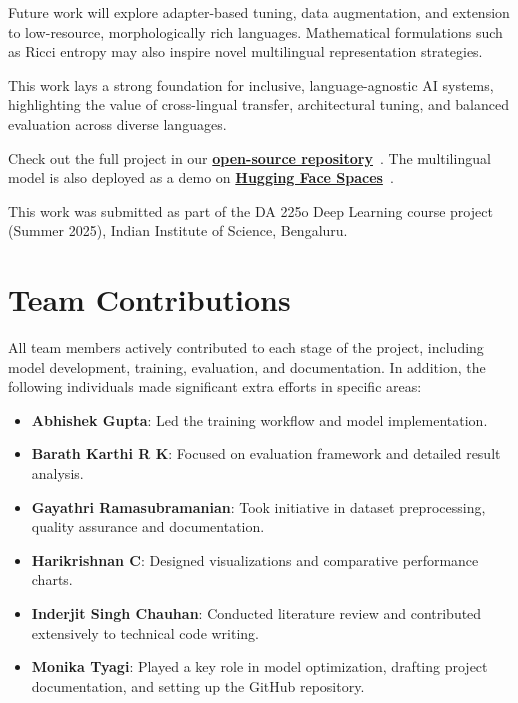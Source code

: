 \documentclass{ecai}
\begin{document}
Future work will explore adapter-based tuning, data augmentation, and extension to low-resource, morphologically rich languages. Mathematical formulations such as Ricci entropy \cite{perelman2002entropy} may also inspire novel multilingual representation strategies.

This work lays a strong foundation for inclusive, language-agnostic AI systems, highlighting the value of cross-lingual transfer, architectural tuning, and balanced evaluation across diverse languages. 

Check out the full project in our \href{https://github.com/monikatyagiisc/deep-data-squad-19}{\textbf{open-source repository}}~\cite{deepdatasquad2025}.  
The multilingual model is also deployed as a demo on \href{https://huggingface.co/spaces/charikri/IntentBert#multilingual-intent-classification}{\textbf{Hugging Face Spaces}}~\cite{intentbert_demo2025}.


\begin{ack}
This work was submitted as part of the DA 225o Deep Learning course project (Summer 2025), Indian Institute of Science, Bengaluru.
\end{ack}




\newpage
\section*{Team Contributions}
All team members actively contributed to each stage of the project, including model development, training, evaluation, and documentation. In addition, the following individuals made significant extra efforts in specific areas:

\begin{itemize}
    \item \textbf{Abhishek Gupta}: Led the training workflow and model implementation.
    \item \textbf{Barath Karthi R K}: Focused on evaluation framework and detailed result analysis.
    \item \textbf{Gayathri Ramasubramanian}: Took initiative in dataset preprocessing, quality assurance and documentation.
    \item \textbf{Harikrishnan C}: Designed visualizations and comparative performance charts.
    \item \textbf{Inderjit Singh Chauhan}: Conducted literature review and contributed extensively to technical code writing.
    \item \textbf{Monika Tyagi}: Played a key role in model optimization, drafting project documentation, and setting up the GitHub repository.
\end{itemize}
\end{document}
